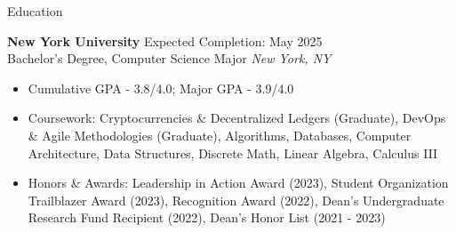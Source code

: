 \documentclass{resume} %
\begin{document}

\begin{rSection}{Education}

	\textbf{New York University} \hfill Expected Completion: May 2025\\
	Bachelor's Degree, Computer Science Major \hfill \textit{New York, NY}
	\begin{itemize}
		\item Cumulative GPA - 3.8/4.0; Major GPA - 3.9/4.0
		\item Coursework: Cryptocurrencies \& Decentralized Ledgers (Graduate), DevOps \& Agile Methodologies (Graduate),
		      Algorithms, Databases, Computer Architecture, Data Structures, Discrete Math,
		      Linear Algebra, Calculus III
		\item Honors \& Awards: Leadership in Action Award (2023), Student Organization Trailblazer Award (2023), Recognition Award (2022), Dean's Undergraduate Research Fund Recipient (2022), Dean's Honor List (2021 - 2023)
	\end{itemize}

\end{rSection}

\end{document}
